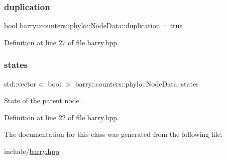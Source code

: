\subsubsection{\texorpdfstring{duplication}{duplication}}
{\footnotesize\ttfamily bool barry\+::counters\+::phylo\+::\+Node\+Data\+::duplication = true}



Definition at line 27 of file barry.\+hpp.

\mbox{\label{classbarry_1_1counters_1_1phylo_1_1_node_data_a9a88332b03b6c78f386a1fafac660052}} 
\subsubsection{\texorpdfstring{states}{states}}
{\footnotesize\ttfamily std\+::vector$<$ bool $>$ barry\+::counters\+::phylo\+::\+Node\+Data\+::states}

State of the parent node. 

Definition at line 22 of file barry.\+hpp.



The documentation for this class was generated from the following file\+:\begin{DoxyCompactItemize}
\item 
include/\hyperlink{barry_8hpp}{barry.\+hpp}\end{DoxyCompactItemize}
